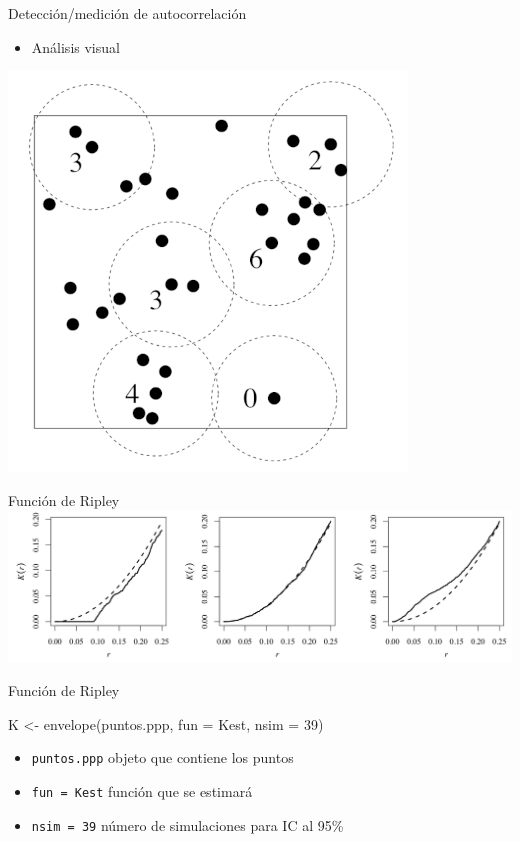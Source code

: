 \documentclass[
  11pt,
  ignorenonframetext,
]{beamer}
\newenvironment{Shaded}{}{}
\newcommand{\AttributeTok}[1]{\textcolor[rgb]{0.49,0.56,0.16}{#1}}
\newcommand{\DecValTok}[1]{\textcolor[rgb]{0.25,0.63,0.44}{#1}}
\newcommand{\FunctionTok}[1]{\textcolor[rgb]{0.02,0.16,0.49}{#1}}
\newcommand{\NormalTok}[1]{#1}
\newcommand{\OtherTok}[1]{\textcolor[rgb]{0.00,0.44,0.13}{#1}}
\providecommand{\tightlist}{%
  \setlength{\itemsep}{0pt}\setlength{\parskip}{0pt}}
\begin{document}
\begin{frame}{Detección/medición de autocorrelación}
\protect\hypertarget{detecciuxf3nmediciuxf3n-de-autocorrelaciuxf3n}{}
\begin{itemize}
\tightlist
\item
  Análisis visual
\end{itemize}

\begin{center}\includegraphics{Figuras/Cuenta-vecinos} \end{center}
\end{frame}

\begin{frame}{Función de Ripley}
\protect\hypertarget{funciuxf3n-de-ripley}{}
\includegraphics{Figuras/K-Ripley.png}
\end{frame}

\begin{frame}[fragile]{Función de Ripley}
\protect\hypertarget{funciuxf3n-de-ripley-1}{}
\begin{Shaded}
\begin{Highlighting}[]
\NormalTok{K }\OtherTok{\textless{}{-}} \FunctionTok{envelope}\NormalTok{(puntos.ppp, }\AttributeTok{fun =}\NormalTok{ Kest, }\AttributeTok{nsim =} \DecValTok{39}\NormalTok{)}
\end{Highlighting}
\end{Shaded}

\begin{itemize}
\tightlist
\item
  \texttt{puntos.ppp} objeto que contiene los puntos
\item
  \texttt{fun\ =\ Kest} función que se estimará
\item
  \texttt{nsim\ =\ 39} número de simulaciones para IC al 95\%
\end{itemize}
\end{frame}
\end{document}
